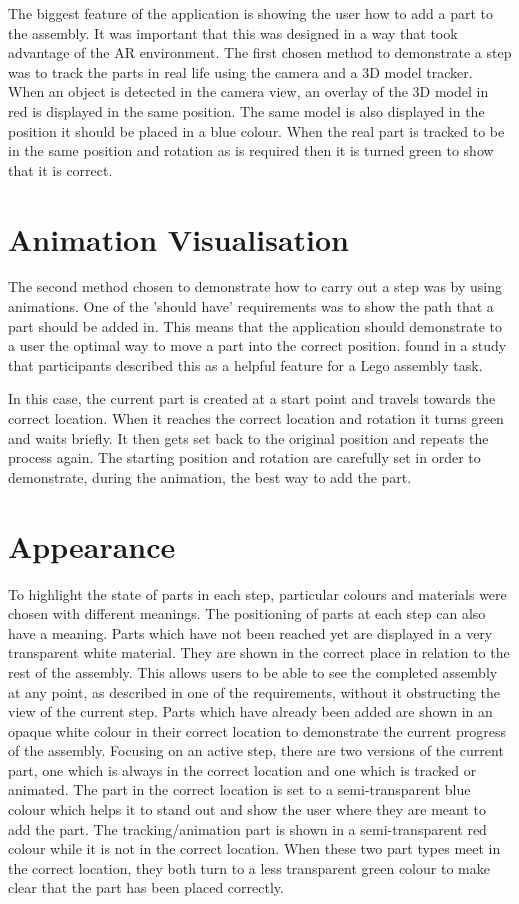 \documentclass{l4proj}
\begin{document}
The biggest feature of the application is showing the user how to add a part to the assembly. It was important that this was designed in a way that took advantage of the AR environment. The first chosen method to demonstrate a step was to track the parts in real life using the camera and a 3D model tracker. When an object is detected in the camera view, an overlay of the 3D model in red is displayed in the same position. The same model is also displayed in the position it should be placed in a blue colour. When the real part is tracked to be in the same position and rotation as is required then it is turned green to show that it is correct.

\section{Animation Visualisation}

The second method chosen to demonstrate how to carry out a step was by using animations. One of the 'should have' requirements was to show the path that a part should be added in. This means that the application should demonstrate to a user the optimal way to move a part into the correct position. \citet{yang_comparing_2020} found in a study that participants described this as a helpful feature for a Lego assembly task. 

In this case, the current part is created at a start point and travels towards the correct location. When it reaches the correct location and rotation it turns green and waits briefly. It then gets set back to the original position and repeats the process again. The starting position and rotation are carefully set in order to demonstrate, during the animation, the best way to add the part.

\section{Appearance}

To highlight the state of parts in each step, particular colours and materials were chosen with different meanings. The positioning of parts at each step can also have a meaning. Parts which have not been reached yet are displayed in a very transparent white material. They are shown in the correct place in relation to the rest of the assembly. This allows users to be able to see the completed assembly at any point, as described in one of the requirements, without it obstructing the view of the current step. Parts which have already been added are shown in an opaque white colour in their correct location to demonstrate the current progress of the assembly. Focusing on an active step, there are two versions of the current part, one which is always in the correct location and one which is tracked or animated. The part in the correct location is set to a semi-transparent blue colour which helps it to stand out and show the user where they are meant to add the part. The tracking/animation part is shown in a semi-transparent red colour while it is not in the correct location. When these two part types meet in the correct location, they both turn to a less transparent green colour to make clear that the part has been placed correctly.
\end{document}
